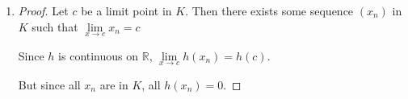 \documentclass[12pt,letterpaper]{article}
\begin{document}
\begin{enumerate}[label=Exercise 4.3.\arabic*]
\begin{enumerate}
\begin{proof}
            Choose some rational number $c$ in lowest terms $\frac{m}{n}$.

            Now construct any sequence $(x_n)$ from $\mathbb{I}$ such that,
            $(x_n) \to c$.

            So, $f(x_n) \to 0$, but $f(c) = \frac{1}{n}$.

            Now, since $f : \mathbb{R} \to \mathbb{R}$,
            $c$ is a limit point in $\mathbb{R}$,
            $(x_n) \to c$,
            but $f(x_n) \neq f(c)$,
            we conclude that Thomae's function is not continuous at any rational point.
          \end{proof}
        \item
          \begin{proof}
            We have
            \[
              f(x) =
              \begin{cases}
                1           & \text{if } x = 0 \\
                \frac{1}{n} & \text{if } x = \frac{m}{n} \in \mathbb{Q} \setminus \{0\} \text{ is in lowest terms with } n > 0 \\
                0           & \text{if } x \notin \mathbb{Q} \\
              \end{cases}
            \].

            Choose some $c \in \mathbb{I}$.
            Then we know that $f(c) = 0$, since $c \notin \mathbb{Q}$.

            Now given, some $\epsilon > 0$, choose $\delta = \epsilon$.

            So for $x \in \mathbb{I}$ where $|x - c| < \delta$,
            we have $|f(x) - f(c)| = |0 - 0| = 0 < \epsilon$.

            Thus, by Theorem 4.3.2, $f$ is continuous on $\mathbb{I}$.
          \end{proof}
      \end{enumerate}

    \item
      \begin{proof}

        Let $c$ be a limit point in $K$.
        Then there exists some sequence $(x_n)$ in $K$ such that
        $\lim\limits_{x \to c}x_n = c$

        Since $h$ is continuous on $\mathbb{R}$,
        $\lim\limits_{x \to c} h(x_n) = h(c)$.

        But since all $x_n$ are in $K$, all $h(x_n) = 0$.


\end{proof}
\end{enumerate}
\end{document}
